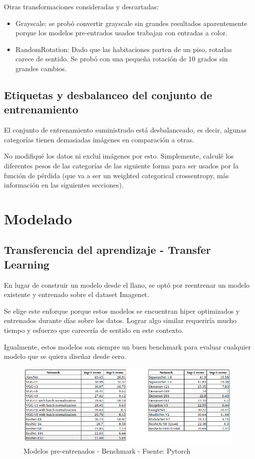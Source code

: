 \documentclass{article}
\begin{document}
Otras transformaciones consideradas y descartadas: 

\begin{itemize}
  \item Grayscale: se probó convertir grayscale sin grandes resultados aparentemente porque los modelos pre-entrados usados trabajan con entradas a color. 
  \item RandomRotation: Dado que las habitaciones parten de un piso, rotarlas carece de sentido. Se probó con una pequeña rotación de 10 grados sin grandes cambios.
\end{itemize}

\subsection{Etiquetas y desbalanceo del conjunto de entrenamiento}

El conjunto de entrenamiento suministrado está desbalanceado, es decir, algunas categorías tienen demasiadas imágenes en comparación a otras. 

No modifiqué los datos ni excluí imágenes por esto. Simplemente, calculé los diferentes pesos de las categorías de las siguiente forma para ser usados por la función de pérdida (que va a ser un weighted categorical crossentropy, más información en las siguientes secciones).
 

\section{Modelado}
\label{sec:headings}

\subsection{Transferencia del aprendizaje - Transfer Learning}

En lugar de construir un modelo desde el llano, se optó por reentrenar un modelo existente y entrenado sobre el dataset Imagenet.

Se elige este enforque porque estos modelos se encuentran hiper optimizados y entrenados durante días sobre los datos. Lograr algo similar requeriría mucho tiempo y esfuerzo que carecería de sentido en este contexto. 

Igualmente, estos modelos son siempre un buen benchmark para evaluar cualquier modelo que se quiera diseñar desde cero. 

\begin{figure}
  \begin{center}
    \includegraphics[width=450px]{img/pytorch-benchmark.png}
    \caption{Modelos pre-entrenados - Benchmark - Fuente: Pytorch}
    \label{models_bench}
  \end{center}
\end{figure}
\end{document}
